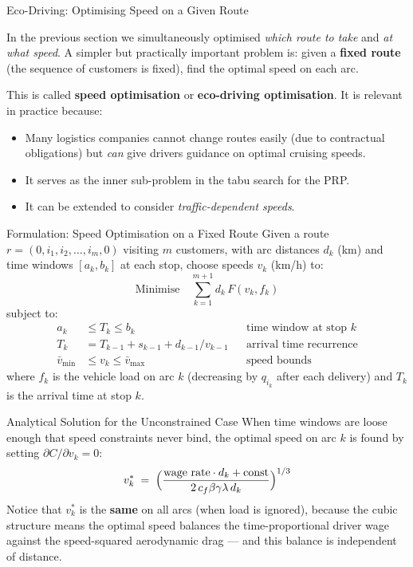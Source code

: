 \documentclass[aspectratio=169,10pt]{beamer}
\begin{document}
\begin{frame}[allowframebreaks]{Eco-Driving: Optimising Speed on a Given Route}

  In the previous section we simultaneously optimised \emph{which route to
  take} and \emph{at what speed}.  A simpler but practically important problem
  is: given a \textbf{fixed route} (the sequence of customers is fixed),
  find the optimal speed on each arc.

  This is called \textbf{speed optimisation} or \textbf{eco-driving optimisation}.
  It is relevant in practice because:
  \begin{itemize}
    \item Many logistics companies cannot change routes easily (due to
    contractual obligations) but \emph{can} give drivers guidance on optimal
    cruising speeds.
    \item It serves as the inner sub-problem in the tabu search for the PRP.
    \item It can be extended to consider \emph{traffic-dependent speeds}.
  \end{itemize}

  \framebreak

  \begin{block}{Formulation: Speed Optimisation on a Fixed Route}
    Given a route $r = (0, i_1, i_2, \ldots, i_m, 0)$ visiting $m$ customers,
    with arc distances $d_k$ (km) and time windows $[a_k, b_k]$ at each stop,
    choose speeds $v_k$ (km/h) to:
    \[
      \text{Minimise} \quad \sum_{k=1}^{m+1} d_k \,F(v_k, f_k)
    \]
    subject to:
    \begin{align*}
      a_k &\leq T_k \leq b_k && \text{time window at stop } k \\
      T_k &= T_{k-1} + s_{k-1} + d_{k-1}/v_{k-1} && \text{arrival time recurrence} \\
      \bar{v}_{\min} &\leq v_k \leq \bar{v}_{\max} && \text{speed bounds}
    \end{align*}
    where $f_k$ is the vehicle load on arc $k$ (decreasing by $q_{i_k}$ after
    each delivery) and $T_k$ is the arrival time at stop $k$.
  \end{block}

  \framebreak

  \begin{block}{Analytical Solution for the Unconstrained Case}
    When time windows are loose enough that speed constraints never bind,
    the optimal speed on arc $k$ is found by setting $\partial C / \partial v_k = 0$:
    \[
      v_k^* \;=\; \Bigl(\frac{\text{wage rate} \cdot d_k + \text{const}}
                          {2\, c_f \beta \gamma \lambda \, d_k}\Bigr)^{1/3}
    \]
    Notice that $v_k^*$ is the \textbf{same} on all arcs (when load is
    ignored), because the cubic structure means the optimal speed balances
    the time-proportional driver wage against the speed-squared aerodynamic
    drag --- and this balance is independent of distance.


\end{block}
\end{frame}
\end{document}
